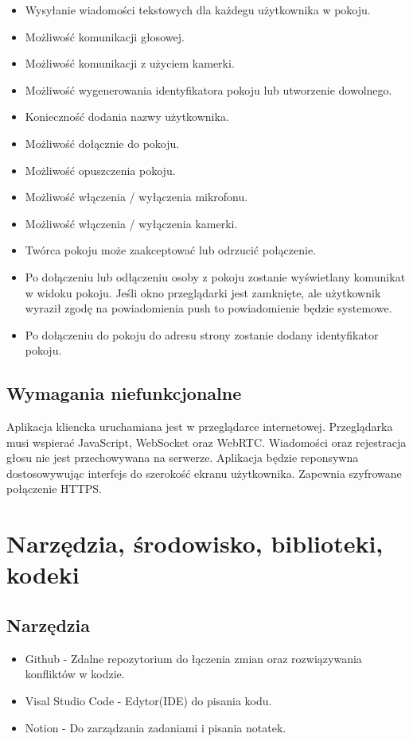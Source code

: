\documentclass{article}
\begin{document}
\begin{itemize}
  \item Wysyłanie wiadomości tekstowych dla każdegu użytkownika w pokoju.
  \item Możliwość komunikacji głosowej.
  \item Możliwość komunikacji z użyciem kamerki.
  \item Możliwość wygenerowania identyfikatora pokoju lub utworzenie dowolnego.
  \item Konieczność dodania nazwy użytkownika.
  \item Możliwość dołącznie do pokoju.
  \item Możliwość opuszczenia pokoju.
  \item Możliwość włączenia / wyłączenia mikrofonu.
  \item Możliwość włączenia / wyłączenia kamerki.
  \item Twórca pokoju może zaakceptować lub odrzucić połączenie.
  \item Po dołączeniu lub odłączeniu osoby z pokoju zostanie wyświetlany komunikat w widoku pokoju. Jeśli okno przeglądarki jest zamknięte, ale użytkownik wyraził zgodę na powiadomienia push to powiadomienie będzie systemowe.
  \item Po dołączeniu do pokoju do adresu strony zostanie dodany identyfikator pokoju.
\end{itemize}

\subsection{Wymagania niefunkcjonalne}
 Aplikacja kliencka uruchamiana jest w przeglądarce internetowej. Przeglądarka musi wspierać JavaScript, WebSocket oraz WebRTC. Wiadomości oraz rejestracja głosu nie jest przechowywana na serwerze. Aplikacja będzie reponsywna dostosowywując interfejs do szerokość ekranu użytkownika. Zapewnia szyfrowane połączenie HTTPS.

\section{Narzędzia, środowisko, biblioteki, kodeki}
\subsection{Narzędzia}

\begin{itemize}
  \item Github - Zdalne repozytorium do łączenia zmian oraz rozwiązywania konfliktów w kodzie.
  \item Visal Studio Code - Edytor(IDE) do pisania kodu.
  \item Notion - Do zarządzania zadaniami i pisania notatek.
\end{itemize}
\end{document}
